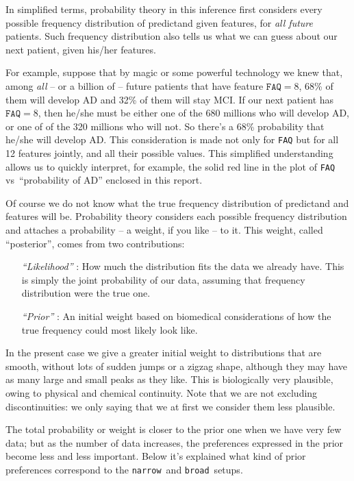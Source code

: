 \documentclass[\ifafour a4paper,12pt,\else a5paper,10pt,\fi%
onecolumn,oneside,article,%
british%
]{memoir}
\theoremstyle{remark}
\theoremstyle{innote}
\renewcommand*{\|}[1][]{\nonscript\:#1\vert\nonscript\:\mathopen{}}
\newcommand*{\vs}{{vs}}
\newcommand*{\narrow}{\texttt{narrow}}
\newcommand*{\broad}{\texttt{broad}}
\begin{document}
In simplified terms, probability theory in this inference first considers
every possible frequency distribution of predictand given features, for
\emph{all future} patients. Such frequency distribution also tells us what
we can guess about our next patient, given his/her features.

For example, suppose that by magic or some powerful technology we knew
that, among \emph{all} -- or a billion of -- future patients that have
feature $\texttt{FAQ}=8$, 68\% of them will develop AD and 32\% of them
will stay MCI. If our next patient has $\texttt{FAQ}=8$, then he/she must
be either one of the 680 millions who will develop AD, or one of of the 320
millions who will not. So there's a 68\% probability that he/she will
develop AD. This consideration is made not only for \texttt{FAQ} but for
all 12 features jointly, and all their possible values. This simplified
understanding allows us to quickly interpret, for example, the solid red
line in the plot of \texttt{FAQ} \vs\ \enquote{probability of AD} enclosed
in this report.

\smallskip

Of course we do not know what the true frequency distribution of predictand
and features will be. Probability theory considers each possible frequency
distribution and attaches a probability -- a weight, if you like -- to it.
This weight, called \enquote{posterior}, comes from two contributions:
\begin{itemize}[wide]
\item[\emph{\enquote{Likelihood}}]\!: How much the distribution fits the data
  we already have. This is simply the joint probability of our data,
  assuming that frequency distribution were the true one.
\item[\emph{\enquote{Prior}}]\!: An initial weight based on biomedical
  considerations of how the true frequency could most likely look like.
\end{itemize}
In the present case we give a greater initial weight to distributions that
are smooth, without lots of sudden jumps or a zigzag shape, although they
may have as many large and small peaks as they like. This is biologically
very plausible, owing to physical and chemical continuity. Note that we are
not excluding discontinuities: we only saying that we at first we consider
them less plausible.

The total probability or weight is closer to the prior one when we have
very few data; but as the number of data increases, the preferences
expressed in the prior become less and less important. Below it's explained
what kind of prior preferences correspond to the \narrow\ and \broad\
setups.
\end{document}
